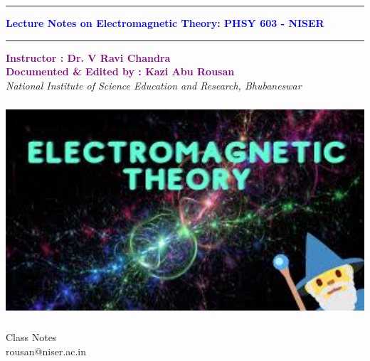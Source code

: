 \documentclass{article}
\begin{document}
\begin{titlepage}
    \begin{center}
    \vspace{0.4cm}
    \hrule
    \Huge
    \vspace{0.8cm}
        \textcolor{blue}{\textbf{Lecture Notes on Electromagnetic Theory: PHSY 603 - NISER}}
        \vspace{0.8cm}
        \hrule
        \vspace{1cm}
        \Large
        \textcolor{purple}{\textbf{Instructor : Dr. V Ravi Chandra  \\ Documented \& Edited by : Kazi Abu Rousan}}\\
        \vspace{0.5cm}
        \large
        \emph{National Institute of Science Education and Research, Bhubaneswar}\\
        \vspace{0.8cm}
        
        \begin{center}
		\vspace{0.2cm}
		\includegraphics[height=8cm]{Images/logo.jpeg}\\
		\end{center}
        \vspace{0.5cm}
        \vspace{0.4cm}
        \Large
        Class Notes\\
        \vspace{0.7cm}
        rousan@niser.ac.in\\
      
        \vspace{1.3cm}
        
        
        
    \end{center}
\end{titlepage}
\newpage
\end{document}
